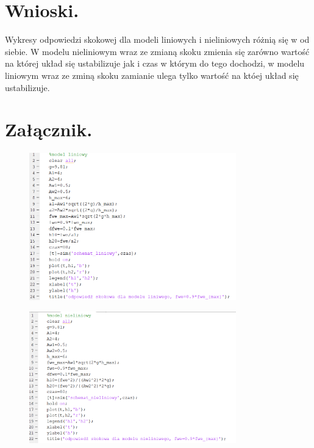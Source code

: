 \documentclass{article}
\begin{document}
\section{Wnioski.}
Wykresy odpowiedzi skokowej dla modeli liniowych i nieliniowych różnią się w od siebie. W modelu nieliniowym wraz ze zmianą skoku zmienia się zarówno wartość na której układ się ustabilizuje jak i czas w którym do tego dochodzi, w modelu liniowym wraz ze zminą skoku zamianie ulega tylko wartość na któej układ się ustabilizuje. 
\section{Załącznik.}
\begin{figure}[h!]
    \centering
    \includegraphics[width=0.8\textwidth]{KL.png}
    \label{fig:my_label}
\end{figure}
\begin{figure}[h!]
    \centering
    \includegraphics[width=0.8\textwidth]{KNL.png}
    \label{fig:my_label}
\end{figure}
\end{document}
